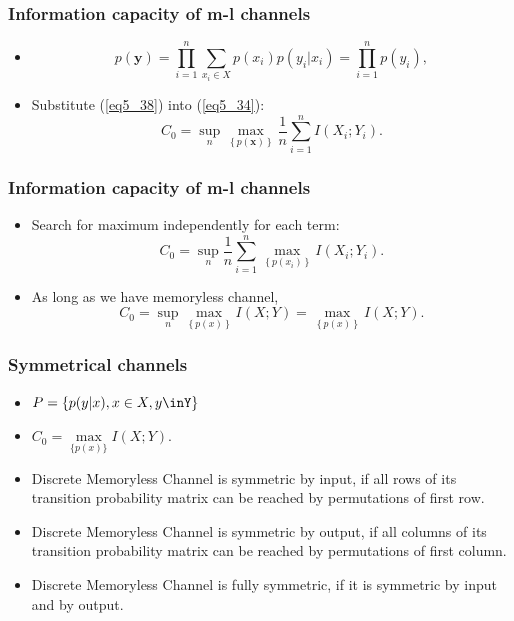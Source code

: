 \documentclass[14pt]{beamer}
\renewcommand{\vec}[1]{\ensuremath{\boldsymbol{#1}}}
\begin{document}
\begin{frame}
\frametitle{Information capacity of m-l channels}
\begin{itemize}

    \item 
    \[
    p({\vec y}) = \prod\limits_{i = 1}^n {\sum\limits_{x_i \in X} {p(x_i
    )p(y_i \vert x_i )} } = \prod\limits_{i = 1}^n {p(y_i )} ,
    \]
    

    \item Substitute (\ref{eq5_38}) into (\ref{eq5_34}):
    \[
    C_0 = \mathop {\sup }\limits_n \mathop {\max }%
    \limits_{\left\{ {p({\vec x})} \right\}} \frac{1}{n}\sum\limits_{i =
    1}^n I (X_i ;Y_i ).
    \]
    
\end{itemize}
\end{frame}



\begin{frame}
\frametitle{Information capacity of m-l channels}
\begin{itemize}
     
    \item Search for maximum independently for each term:
    \[
    C_0 = \mathop {\sup }\limits_n \frac{1}{n}\sum\limits_{i = 1}^n {\mathop
    {\max }\limits_{\left\{ {p(x_i )} \right\}} I} (X_i ;Y_i ).
    \]


    \item As long as we have memoryless channel, 
    \[
    C_0 = \mathop {\sup }\limits_n \mathop {\max }\limits_{\left\{ {p(x)}
    \right\}} I(X;Y) = \mathop {\max }\limits_{\left\{ {p(x)} \right\}} I(X;Y).
    \]
    \QED

\end{itemize}
\end{frame}


\begin{frame}
\frametitle{Symmetrical channels}
\begin{itemize}

    \item $P = \{p(y\vert x),x \in X,y \inY\}$
    \item \label{eq5_39} $C_0 = \mathop {\max }\limits_{\{p(x)\}} I(X;Y).$
    
    \item Discrete Memoryless Channel is symmetric by input, if all rows of its transition probability matrix can be reached by permutations of first row.

    \item Discrete Memoryless Channel is symmetric by output, if all columns of its transition probability matrix can be reached by permutations of first column.
    
    \item Discrete Memoryless Channel is fully symmetric, if it is symmetric by input and by output.
    
\end{itemize}
\end{frame}
\end{document}
